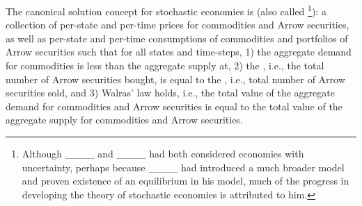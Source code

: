 
The canonical solution concept for stochastic economies is  (also called %
\footnote{Although ____ and ____ had both considered economies with uncertainty, perhaps because ____ had introduced a much broader model and proven existence of an equilibrium in his model, much of the progress in developing the theory of stochastic economies is attributed to him.}): a collection of per-state and per-time prices for commodities and Arrow securities, as well as per-state and per-time consumptions of commodities and portfolios of Arrow securities such that for all states and time-steps, 1) the aggregate demand for commodities is less than the aggregate supply at, 2) the , i.e., the total number of Arrow securities bought, is equal to  the , i.e., total number of Arrow securities sold, and 3) Walras' law holds, i.e., the total value of the aggregate demand for commodities and Arrow securities is equal to the total value of the aggregate supply for commodities and Arrow securities.
\fi




